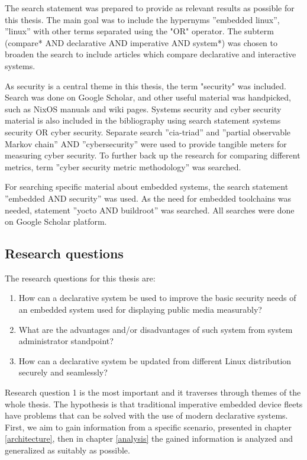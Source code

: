 The search statement was prepared to provide as relevant results as
possible for this thesis. The main goal was to include the hypernyms
''embedded linux'', ''linux'' with other terms separated using the
"OR" operator. The subterm (compare* AND declarative AND imperative
AND system*) was chosen to broaden the search to include articles
which compare declarative and interactive systems.

As security is a central theme in this thesis, the term "security" was
included. Search was done on Google Scholar, and other useful material
was handpicked, such as NixOS manuals and wiki pages. Systems security
and cyber security material is also included in the bibliography using
search statement systems security OR cyber security. Separate search
''cia-triad'' and ''partial observable Markov chain'' AND
''cybersecurity'' were used to provide tangible meters for
measuring cyber security. To further back up the research for
comparing different metrics, term ''cyber security metric
methodology'' was searched.

For searching specific material about embedded systems, the search
statement ''embedded AND security'' was used. As the need for embedded
toolchains was needed, statement ''yocto AND buildroot'' was
searched. All searches were done on Google Scholar platform.

\subsection{Research questions} \label{resquest}

The research questions for this thesis are:

\begin{enumerate}
\item How can a declarative system be used to improve the basic
  security needs of an embedded system used for displaying public
  media measurably?
\item What are the advantages and/or disadvantages of such system from
  system administrator standpoint?
\item How can a declarative system be updated from different Linux
  distribution securely and seamlessly?
\end{enumerate}

Research question 1 is the most important and it traverses
through themes of the whole thesis. The hypothesis is that traditional
imperative embedded device fleets have problems that can be solved
with the use of modern declarative systems. First, we aim to gain
information from a specific scenario, presented in chapter
\ref{architecture}, then in chapter \ref{analysis} the gained
information is analyzed and generalized as suitably as possible. 

